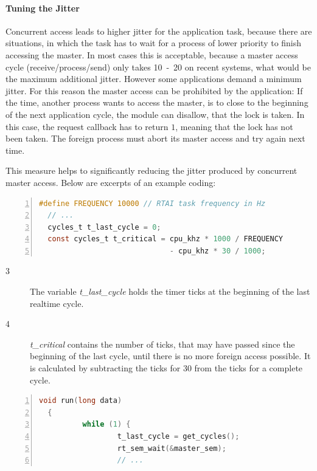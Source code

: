 \documentclass[a4paper,12pt,BCOR6mm,bibtotoc,idxtotoc]{scrbook}
\newcommand{\linenum}[1]{\normalfont\textcircled{\tiny #1}}
\begin{document}
\paragraph{Tuning the Jitter}

Concurrent access leads to higher jitter for the application task, because
there are situations, in which the task has to wait for a process of lower
priority to finish accessing the master.  In most cases this is acceptable,
because a master access cycle (receive/process/send) only takes
\unit{10-20}{\micro\second} on recent systems, what would be the maximum
additional jitter. However some applications demand a minimum jitter. For this
reason the master access can be prohibited by the application: If the time,
another process wants to access the master, is to close to the beginning of the
next application cycle, the module can disallow, that the lock is taken. In
this case, the request callback has to return $1$, meaning that the lock has
not been taken. The foreign process must abort its master access and try again
next time.

This measure helps to significantly reducing the jitter produced by concurrent
master access. Below are excerpts of an example coding:

\begin{lstlisting}[gobble=2,language=C,numbers=left,caption={Variables for
    jitter reduction},label={lst:redvar}]
  #define FREQUENCY 10000 // RTAI task frequency in Hz
  // ...
  cycles_t t_last_cycle = 0;
  const cycles_t t_critical = cpu_khz * 1000 / FREQUENCY
                              - cpu_khz * 30 / 1000;
\end{lstlisting}

\begin{description}

\item[\linenum{3}] The variable \textit{t\_last\_cycle} holds the timer ticks
at the beginning of the last realtime cycle.

\item[\linenum{4}] \textit{t\_critical} contains the number of ticks, that may
have passed since the beginning of the last cycle, until there is no more
foreign access possible. It is calculated by subtracting the ticks for
\unit{30}{\micro\second} from the ticks for a complete cycle.

\end{description}

\begin{lstlisting}[gobble=2,language=C,numbers=left,caption={Cyclic function
    with reduced jitter},label={lst:redrun}]
  void run(long data)
  {
          while (1) {
                  t_last_cycle = get_cycles();
                  rt_sem_wait(&master_sem);
                  // ...
\end{lstlisting}
\end{document}
